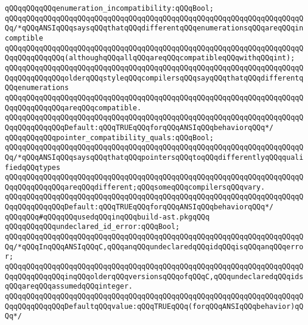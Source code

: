 \newline
\verb|qQQqqQQqqQQqenumeration_incompatibility:qQQqBool;|\newline
\verb|qQQqqQQqqQQqqQQqqQQqqQQqqQQqqQQqqQQqqQQqqQQqqQQqqQQqqQQqqQQqqQQqqQQqqQQq/*qQQqANSIqQQqsaysqQQqthatqQQqdifferentqQQqenumerationsqQQqareqQQqincomptible|\newline
\verb|qQQqqQQqqQQqqQQqqQQqqQQqqQQqqQQqqQQqqQQqqQQqqQQqqQQqqQQqqQQqqQQqqQQqqQQqqQQqqQQqqQQq(althoughqQQqallqQQqareqQQqcompatibleqQQqwithqQQqint);|\newline
\verb|qQQqqQQqqQQqqQQqqQQqqQQqqQQqqQQqqQQqqQQqqQQqqQQqqQQqqQQqqQQqqQQqqQQqqQQqqQQqqQQqqQQqolderqQQqstyleqQQqcompilersqQQqsayqQQqthatqQQqdifferentqQQqenumerations|\newline
\verb|qQQqqQQqqQQqqQQqqQQqqQQqqQQqqQQqqQQqqQQqqQQqqQQqqQQqqQQqqQQqqQQqqQQqqQQqqQQqqQQqqQQqareqQQqcompatible.|\newline
\verb|qQQqqQQqqQQqqQQqqQQqqQQqqQQqqQQqqQQqqQQqqQQqqQQqqQQqqQQqqQQqqQQqqQQqqQQqqQQqqQQqqQQqDefault:qQQqTRUEqQQqforqQQqANSIqQQqbehaviorqQQq*/|\newline
\newline
\verb|qQQqqQQqqQQqpointer_compatibility_quals:qQQqBool;|\newline
\verb|qQQqqQQqqQQqqQQqqQQqqQQqqQQqqQQqqQQqqQQqqQQqqQQqqQQqqQQqqQQqqQQqqQQqqQQq/*qQQqANSIqQQqsaysqQQqthatqQQqpointersqQQqtoqQQqdifferentlyqQQqqualifiedqQQqtypes|\newline
\verb|qQQqqQQqqQQqqQQqqQQqqQQqqQQqqQQqqQQqqQQqqQQqqQQqqQQqqQQqqQQqqQQqqQQqqQQqqQQqqQQqqQQqareqQQqdifferent;qQQqsomeqQQqcompilersqQQqvary.|\newline
\verb|qQQqqQQqqQQqqQQqqQQqqQQqqQQqqQQqqQQqqQQqqQQqqQQqqQQqqQQqqQQqqQQqqQQqqQQqqQQqqQQqqQQqDefault:qQQqTRUEqQQqforqQQqANSIqQQqbehaviorqQQq*/|\newline
\newline
\verb|qQQqqQQq#qQQqqQQqusedqQQqinqQQqbuild-ast.pkgqQQq|\newline
\verb|qQQqqQQqqQQqundeclared_id_error:qQQqBool;|\newline
\verb|qQQqqQQqqQQqqQQqqQQqqQQqqQQqqQQqqQQqqQQqqQQqqQQqqQQqqQQqqQQqqQQqqQQqqQQq/*qQQqInqQQqANSIqQQqC,qQQqanqQQqundeclaredqQQqidqQQqisqQQqanqQQqerror;|\newline
\verb|qQQqqQQqqQQqqQQqqQQqqQQqqQQqqQQqqQQqqQQqqQQqqQQqqQQqqQQqqQQqqQQqqQQqqQQqqQQqqQQqqQQqinqQQqolderqQQqversionsqQQqofqQQqC,qQQqundeclaredqQQqidsqQQqareqQQqassumedqQQqinteger.|\newline
\verb|qQQqqQQqqQQqqQQqqQQqqQQqqQQqqQQqqQQqqQQqqQQqqQQqqQQqqQQqqQQqqQQqqQQqqQQqqQQqqQQqqQQqDefaultqQQqvalue:qQQqTRUEqQQq(forqQQqANSIqQQqbehavior)qQQq*/|\newline
